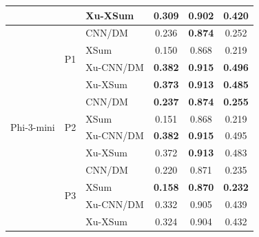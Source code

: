 \begin{table}[H]
\begin{tabular}{lllccc}
 &  & Xu-XSum & 0.309 & 0.902 & 0.420 \\
\midrule
\multirow{12}{*}{Phi-3-mini} & \multirow{4}{*}{P1} & CNN/DM & 0.236 & \textbf{0.874} & 0.252 \\
 &  & XSum & 0.150 & 0.868 & 0.219 \\
 &  & Xu-CNN/DM & \textbf{0.382} & \textbf{0.915} & \textbf{0.496} \\
 &  & Xu-XSum & \textbf{0.373} & \textbf{0.913} & \textbf{0.485} \\
\cmidrule(lr){2-6}
 & \multirow{4}{*}{P2} & CNN/DM & \textbf{0.237} & \textbf{0.874} & \textbf{0.255} \\
 &  & XSum & 0.151 & 0.868 & 0.219 \\
 &  & Xu-CNN/DM & \textbf{0.382} & \textbf{0.915} & 0.495 \\
 &  & Xu-XSum & 0.372 & \textbf{0.913} & 0.483 \\
\cmidrule(lr){2-6}
 & \multirow{4}{*}{P3} & CNN/DM & 0.220 & 0.871 & 0.235 \\
 &  & XSum & \textbf{0.158} & \textbf{0.870} & \textbf{0.232} \\
 &  & Xu-CNN/DM & 0.332 & 0.905 & 0.439 \\
 &  & Xu-XSum & 0.324 & 0.904 & 0.432 \\
\bottomrule
\end{tabular}
\end{table}

